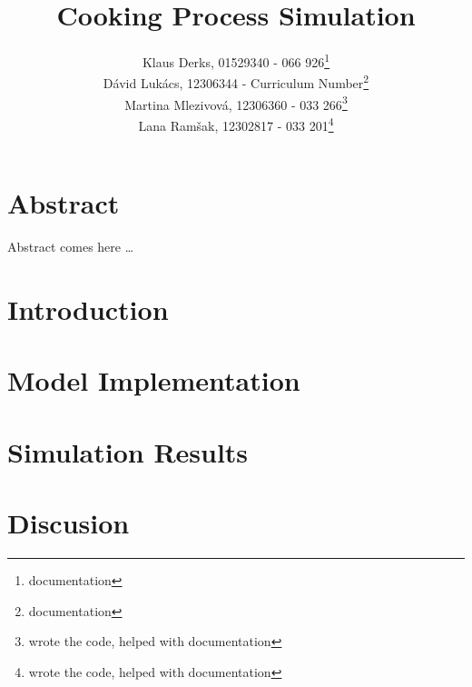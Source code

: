 \documentclass[a4paper,11pt]{scrartcl}
\begin{document}
\subject{Modeling and Simulation}
\title{Cooking Process Simulation}

\publishers{Supervisor: Martin Bicher}
\author{Klaus Derks, 01529340 - 066 926\footnote{documentation} \\                 %
Dávid Lukács, 12306344 - Curriculum Number\footnote{documentation}\\               %
Martina Mlezivová, 12306360 - 033 266\footnote{wrote the code, helped with documentation}\\ %
Lana Ramšak, 12302817 - 033 201\footnote{wrote the code, helped with documentation}}        %

\maketitle

\section*{Abstract}

Abstract comes here \dots

\newpage

\tableofcontents

\newpage

\section{Introduction}



\newpage

\section{Model Implementation}


\newpage
\section{Simulation Results}


\newpage
\section{Discusion}


\newpage



\end{document}
